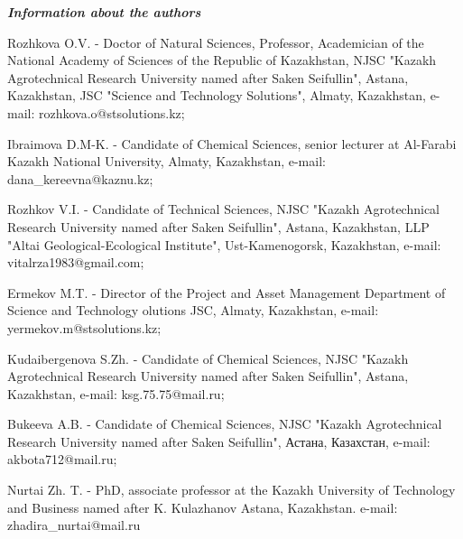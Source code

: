 \emph{{\bfseries Information about the authors}}

\begin{noparindent}
Rozhkova O.V. - Doctor of Natural Sciences, Professor, Academician of
the National Academy of Sciences of the Republic of Kazakhstan, NJSC
"Kazakh Agrotechnical Research University named after Saken Seifullin",
Astana, Kazakhstan, JSC "Science and Technology Solutions", Almaty,
Kazakhstan, e-mail: rozhkova.o@stsolutions.kz;

Ibraimova D.M-K. - Candidate of Chemical Sciences, senior lecturer at
Al-Farabi Kazakh National University, Almaty, Kazakhstan, e-mail:
dana\_kereevna@kaznu.kz;

Rozhkov V.I. - Candidate of Technical Sciences, NJSC "Kazakh
Agrotechnical Research University named after Saken Seifullin", Astana,
Kazakhstan, LLP "Altai Geological-Ecological Institute",
Ust-Kamenogorsk, Kazakhstan, e-mail: vitalrza1983@gmail.com;

Ermekov M.T. - Director of the Project and Asset Management Department
of Science and Technology olutions JSC, Almaty, Kazakhstan, e-mail:
yermekov.m@stsolutions.kz;

Kudaibergenova S.Zh. - Candidate of Chemical Sciences, NJSC "Kazakh
Agrotechnical Research University named after Saken Seifullin", Astana,
Kazakhstan, e-mail: ksg.75.75@mail.ru;

Bukeeva A.B. - Candidate of Chemical Sciences, NJSC "Kazakh
Agrotechnical Research University named after Saken Seifullin", Астана,
Казахстан, e-mail: akbota712@mail.ru;

Nurtai Zh. T. - PhD, associate professor at the Kazakh University of
Technology and Business named after K. Kulazhanov Astana, Kazakhstan.
e-mail: zhadira\_nurtai@mail.ru
\end{noparindent}
